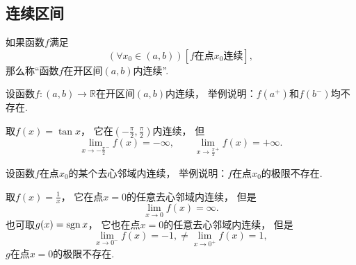 \subsection{连续区间}
\begin{definition}
如果函数\(f\)满足\[
	(\forall x_0\in(a,b))
	[\text{\(f\)在点\(x_0\)连续}],
\]
那么称“函数\(f\)在开区间\((a,b)\)内连续”.
\end{definition}

\begin{example}
设函数\(f\colon(a,b)\to\mathbb{R}\)在开区间\((a,b)\)内连续，
举例说明：\(f(a^+)\)和\(f(b^-)\)均不存在.
\begin{solution}
取\(f(x) = \tan x\)，
它在\(\left( -\frac\pi2,\frac\pi2 \right)\)内连续，
但\[
	\lim_{x\to-\frac\pi2^-} f(x) = -\infty,
	\qquad
	\lim_{x\to\frac\pi2^+} f(x) = +\infty.
\]
\end{solution}
\end{example}
\begin{example}
设函数\(f\)在点\(x_0\)的某个去心邻域内连续，
举例说明：\(f\)在点\(x_0\)的极限不存在.
\begin{solution}
取\(f(x) = \frac1x\)，
它在点\(x=0\)的任意去心邻域内连续，
但是\[
	\lim_{x\to0} f(x) = \infty.
\]
也可取\(g(x) = \operatorname{sgn} x\)，
它也在点\(x=0\)的任意去心邻域内连续，
但是\[
	\lim_{x\to0^-} f(x) = -1,
	\neq
	\lim_{x\to0^+} f(x) = 1,
\]
\(g\)在点\(x=0\)的极限不存在.
\end{solution}
\end{example}

